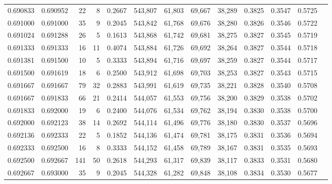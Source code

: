 \begin{tabular}{rrrrrrrrrrrrr}
0.690833 & 0.690952 &    22 &   8 &                                     0.2667 & 543,807 &  61,803 &  69,667 &  38,289 & 0.3825 & 0.3547 & 0.5725 \\
0.691000 & 0.691000 &    35 &   9 &                                     0.2045 & 543,842 &  61,768 &  69,676 &  38,280 & 0.3826 & 0.3546 & 0.5722 \\
0.691024 & 0.691288 &    26 &   5 &                                     0.1613 & 543,868 &  61,742 &  69,681 &  38,275 & 0.3827 & 0.3545 & 0.5719 \\
0.691333 & 0.691333 &    16 &  11 &                                     0.4074 & 543,884 &  61,726 &  69,692 &  38,264 & 0.3827 & 0.3544 & 0.5718 \\
0.691381 & 0.691500 &    10 &   5 &                                     0.3333 & 543,894 &  61,716 &  69,697 &  38,259 & 0.3827 & 0.3544 & 0.5717 \\
0.691500 & 0.691619 &    18 &   6 &                                     0.2500 & 543,912 &  61,698 &  69,703 &  38,253 & 0.3827 & 0.3543 & 0.5715 \\
0.691667 & 0.691667 &    79 &  32 &                                     0.2883 & 543,991 &  61,619 &  69,735 &  38,221 & 0.3828 & 0.3540 & 0.5708 \\
0.691667 & 0.691833 &    66 &  21 &                                     0.2414 & 544,057 &  61,553 &  69,756 &  38,200 & 0.3829 & 0.3538 & 0.5702 \\
0.691833 & 0.692000 &    19 &   6 &                                     0.2400 & 544,076 &  61,534 &  69,762 &  38,194 & 0.3830 & 0.3538 & 0.5700 \\
0.692000 & 0.692123 &    38 &  14 &                                     0.2692 & 544,114 &  61,496 &  69,776 &  38,180 & 0.3830 & 0.3537 & 0.5696 \\
0.692136 & 0.692333 &    22 &   5 &                                     0.1852 & 544,136 &  61,474 &  69,781 &  38,175 & 0.3831 & 0.3536 & 0.5694 \\
0.692333 & 0.692500 &    16 &   8 &                                     0.3333 & 544,152 &  61,458 &  69,789 &  38,167 & 0.3831 & 0.3535 & 0.5693 \\
0.692500 & 0.692667 &   141 &  50 &                                     0.2618 & 544,293 &  61,317 &  69,839 &  38,117 & 0.3833 & 0.3531 & 0.5680 \\
0.692667 & 0.693000 &    35 &   9 &                                     0.2045 & 544,328 &  61,282 &  69,848 &  38,108 & 0.3834 & 0.3530 & 0.5677 \\

\end{tabular}
